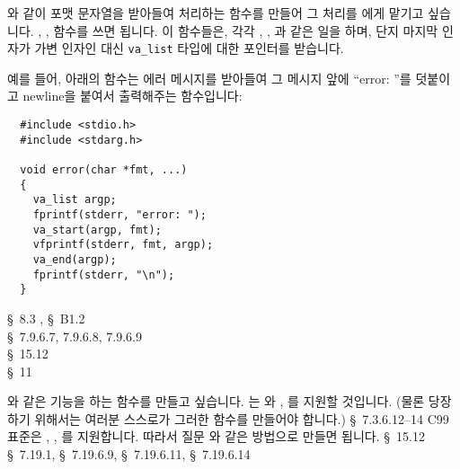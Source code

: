 \begin{faq}
	와 같이 포맷 문자열을 받아들여 처리하는 함수를
	만들어 그 처리를 에게 맡기고 싶습니다.
\A
	, ,  함수를 쓰면
	됩니다. 이 함수들은, 각각 , , 과
        같은 일을 하며, 단지 마지막 인자가 가변 인자인 대신 \verb+va_list+ 타입에
        대한 포인터를 받습니다.
        
        예를 들어, 아래의  함수는 에러 메시지를 받아들여
	그 메시지 앞에 ``error: ''를 덧붙이고 newline을 붙여서 출력해주는
	함수입니다:
\begin{verbatim}
  #include <stdio.h>
  #include <stdarg.h>

  void error(char *fmt, ...)
  {
    va_list argp;
    fprintf(stderr, "error: ");
    va_start(argp, fmt);
    vfprintf(stderr, fmt, argp);
    va_end(argp);
    fprintf(stderr, "\n");
  }
\end{verbatim}
	\noindent {}

\R
	\cite{kr2} \S\ 8.3 , \S\ B1.2  \\
	\cite{c89} \S\ 7.9.6.7, 7.9.6.8, 7.9.6.9 \\
	\cite{hs} \S\ 15.12  \\
	\cite{pcs} \S\ 11 
\end{faq}

\begin{faq}
	와 같은 기능을 하는 함수를 만들고 싶습니다.
\A
	\cite{c9x}는 와 , 를
	지원할 것입니다.  (물론 당장 하기 위해서는 여러분 스스로가
	그러한 함수를 만들어야 합니다.)
\R
	\cite{c9x} \S\ 7.3.6.12--14
\T
	C99 표준은 , , 를
        지원합니다. 따라서 질문 와 같은 방법으로 만들면 됩니다.
\R
	\cite{hs5} \S\ 15.12 
        \cite{c99} \S\ 7.19.1, \S\ 7.19.6.9, \S\ 7.19.6.11, \S\ 7.19.6.14
\end{faq}

